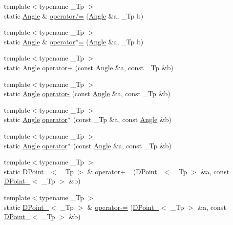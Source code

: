 \begin{DoxyCompactItemize}
\item 
{\footnotesize template$<$typename \-\_\-\-Tp $>$ }\\static \hyperlink{classnubot_1_1Angle}{Angle} \& \hyperlink{namespacenubot_a6a8464620069fa497dde914b198caac5}{operator/=} (\hyperlink{classnubot_1_1Angle}{Angle} \&a, \-\_\-\-Tp b)
\item 
{\footnotesize template$<$typename \-\_\-\-Tp $>$ }\\static \hyperlink{classnubot_1_1Angle}{Angle} \& \hyperlink{namespacenubot_a09c038981f748f7d46b3648a383e832d}{operator$\ast$=} (\hyperlink{classnubot_1_1Angle}{Angle} \&a, \-\_\-\-Tp b)
\item 
{\footnotesize template$<$typename \-\_\-\-Tp $>$ }\\static \hyperlink{classnubot_1_1Angle}{Angle} \hyperlink{namespacenubot_a62776a001819baf70c559410815de5c0}{operator+} (const \hyperlink{classnubot_1_1Angle}{Angle} \&a, const \-\_\-\-Tp \&b)
\item 
{\footnotesize template$<$typename \-\_\-\-Tp $>$ }\\static \hyperlink{classnubot_1_1Angle}{Angle} \hyperlink{namespacenubot_ac5995dd20e2c70a49a5283635b62d4c4}{operator-\/} (const \hyperlink{classnubot_1_1Angle}{Angle} \&a, const \-\_\-\-Tp \&b)
\item 
{\footnotesize template$<$typename \-\_\-\-Tp $>$ }\\static \hyperlink{classnubot_1_1Angle}{Angle} \hyperlink{namespacenubot_abc75ebbe41b6cf227283ca4bc48c52cf}{operator$\ast$} (const \-\_\-\-Tp \&a, const \hyperlink{classnubot_1_1Angle}{Angle} \&b)
\item 
{\footnotesize template$<$typename \-\_\-\-Tp $>$ }\\static \hyperlink{classnubot_1_1Angle}{Angle} \hyperlink{namespacenubot_a5bf5eca744743d34c4ec37d4c6724735}{operator$\ast$} (const \hyperlink{classnubot_1_1Angle}{Angle} \&a, const \-\_\-\-Tp \&b)
\item 
{\footnotesize template$<$typename \-\_\-\-Tp $>$ }\\static \hyperlink{classnubot_1_1DPoint__}{D\-Point\-\_\-}$<$ \-\_\-\-Tp $>$ \& \hyperlink{namespacenubot_aeee7040bf2fb2c3751790a0fc77830b4}{operator+=} (\hyperlink{classnubot_1_1DPoint__}{D\-Point\-\_\-}$<$ \-\_\-\-Tp $>$ \&a, const \hyperlink{classnubot_1_1DPoint__}{D\-Point\-\_\-}$<$ \-\_\-\-Tp $>$ \&b)
\item 
{\footnotesize template$<$typename \-\_\-\-Tp $>$ }\\static \hyperlink{classnubot_1_1DPoint__}{D\-Point\-\_\-}$<$ \-\_\-\-Tp $>$ \& \hyperlink{namespacenubot_a3b73a3b6b460533f8ad79c02efb36d4b}{operator-\/=} (\hyperlink{classnubot_1_1DPoint__}{D\-Point\-\_\-}$<$ \-\_\-\-Tp $>$ \&a, const \hyperlink{classnubot_1_1DPoint__}{D\-Point\-\_\-}$<$ \-\_\-\-Tp $>$ \&b)

\end{DoxyCompactItemize}
